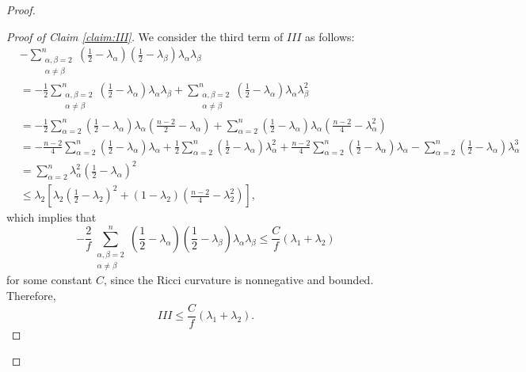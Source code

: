 \documentclass[a4, 12pt]{amsart}
\theoremstyle{plain}
\begin{document}
\begin{proof}
\begin{proof}[Proof of Claim \ref{claim:III}]
		We consider the third term of $III$ as follows:
		\begin{align*}
			&-\sum_{\substack{\alpha,\beta=2 \\ \alpha\neq\beta}}^n\left(\frac{1}{2} - \lambda_{\alpha}\right)\left(\frac{1}{2} - \lambda_{\beta}\right)\lambda_\alpha\lambda_\beta \\
			&= -\frac{1}{2}\sum_{\substack{\alpha,\beta=2 \\ \alpha\neq\beta}}^n\left(\frac{1}{2} - \lambda_{\alpha}\right)\lambda_\alpha\lambda_\beta
			+ \sum_{\substack{\alpha,\beta=2 \\ \alpha\neq\beta}}^n\left(\frac{1}{2} - \lambda_{\alpha}\right)\lambda_\alpha\lambda_\beta^2 \\
			&= -\frac{1}{2}\sum_{\alpha=2}^n\left(\frac{1}{2} - \lambda_{\alpha}\right)\lambda_\alpha\left(\frac{n-2}{2} - \lambda_\alpha\right)
			+ \sum_{\alpha=2}^n\left(\frac{1}{2} - \lambda_{\alpha}\right)\lambda_\alpha\left(\frac{n-2}{4} - \lambda_\alpha^2\right) \\
			&= -\frac{n-2}{4}\sum_{\alpha=2}^n\left(\frac{1}{2} - \lambda_{\alpha}\right)\lambda_\alpha
			+ \frac{1}{2}\sum_{\alpha=2}^n\left(\frac{1}{2} - \lambda_{\alpha}\right)\lambda_\alpha^2
			+ \frac{n-2}{4}\sum_{\alpha=2}^n\left(\frac{1}{2} - \lambda_{\alpha}\right)\lambda_\alpha
			- \sum_{\alpha=2}^n\left(\frac{1}{2} - \lambda_{\alpha}\right)\lambda_\alpha^3 \\
			&= \sum_{\alpha=2}^n\lambda_\alpha^2\left(\frac{1}{2} - \lambda_{\alpha}\right)^2 \\
			&\leq \lambda_2\left[\lambda_2\left(\frac{1}{2} - \lambda_2\right)^2 + (1-\lambda_2)\left(\frac{n-2}{4} - \lambda_2^2\right)\right],
		\end{align*}
		which implies that
		\[
		-\frac{2}{f}\sum_{\substack{\alpha,\beta=2 \\ \alpha\neq\beta}}^n\left(\frac{1}{2} - \lambda_{\alpha}\right)\left(\frac{1}{2} - \lambda_{\beta}\right)\lambda_\alpha\lambda_\beta
		\leq \frac{C}{f}(\lambda_{1}+\lambda_{2})
		\]
		for some constant $C$, since the Ricci curvature is nonnegative and bounded. Therefore,
		\[
		III \leq \frac{C}{f}(\lambda_{1}+\lambda_{2}).
		\]
	\end{proof}
	
	

\end{proof}
\end{document}
